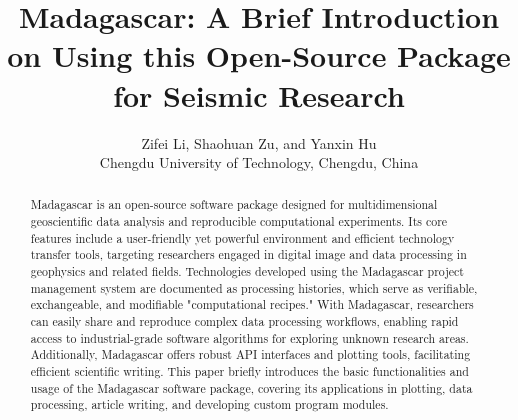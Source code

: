 




\title{Madagascar: A Brief Introduction on Using this Open-Source Package for Seismic Research}

\renewcommand{\thefootnote}{\fnsymbol{footnote}} 

\author{
Zifei Li\footnotemark[2]\footnotemark[1],
Shaohuan Zu\footnotemark[2],
and 
Yanxin Hu\footnotemark[2]
\\
\footnotemark[2]Chengdu University of Technology, Chengdu, China
}


\maketitle

\begin{abstract}
Madagascar is an open-source software package designed for multidimensional geoscientific data analysis and reproducible computational experiments. Its core features include a user-friendly yet powerful environment and efficient technology transfer tools, targeting researchers engaged in digital image and data processing in geophysics and related fields. Technologies developed using the Madagascar project management system are documented as processing histories, which serve as verifiable, exchangeable, and modifiable "computational recipes." With Madagascar, researchers can easily share and reproduce complex data processing workflows, enabling rapid access to industrial-grade software algorithms for exploring unknown research areas. Additionally, Madagascar offers robust API interfaces and plotting tools, facilitating efficient scientific writing. This paper briefly introduces the basic functionalities and usage of the Madagascar software package, covering its applications in plotting, data processing, article writing, and developing custom program modules.

\end{abstract}

